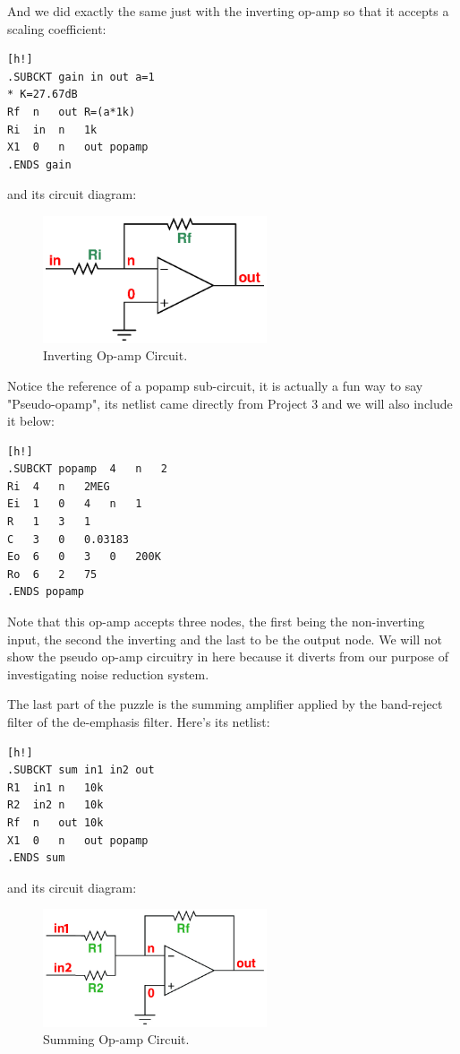 \documentclass[report]{IEEEtran}
\begin{document}
		And we did exactly the same just with the inverting op-amp so that it accepts a scaling coefficient:
		\begin{center}
		\begin{lstlisting}[caption=Inverting Op-Amp netlist.][h!]
.SUBCKT	gain in out a=1
* K=27.67dB
Rf	n	out	R=(a*1k)
Ri	in	n	1k
X1	0	n	out	popamp
.ENDS gain
		\end{lstlisting}
		\end{center}
		and its circuit diagram:
		\begin{figure}[h!]
			\label{gain.cir}
			\includegraphics[width=250px]{gain.eps}
			\caption{Inverting Op-amp Circuit.}
		\end{figure}
		
		Notice the reference of a popamp sub-circuit, it is actually a fun way to say "Pseudo-opamp", its netlist came directly from Project 3 and we will also include it below:
		\begin{center}
		\begin{lstlisting}[caption=RC Pseudo-op-amp netlist.][h!]
.SUBCKT popamp 	4 	n 	2
Ri	4	n	2MEG
Ei	1	0	4	n	1
R	1	3	1
C	3	0	0.03183
Eo	6	0	3	0	200K
Ro	6	2	75
.ENDS popamp
		\end{lstlisting}
		\end{center}
		Note that this op-amp accepts three nodes, the first being the non-inverting input, the second the inverting and the last to be the output node. We will not show the pseudo op-amp circuitry in here because it diverts from our purpose of investigating noise reduction system.
		
		The last part of the puzzle is the summing amplifier applied by the band-reject filter of the de-emphasis filter. Here's its netlist:
		\begin{center}
		\begin{lstlisting}[caption=Summing Op-Amp netlist.][h!]
.SUBCKT sum in1 in2 out
R1	in1	n	10k
R2	in2	n	10k
Rf	n	out	10k
X1	0	n	out	popamp
.ENDS sum 
		\end{lstlisting}
		\end{center}
		and its circuit diagram:
		\begin{figure}[h!]
			\label{sum.cir}
			\includegraphics[width=250px]{sum.jpg}
			\caption{Summing Op-amp Circuit.}
		\end{figure}
\end{document}
